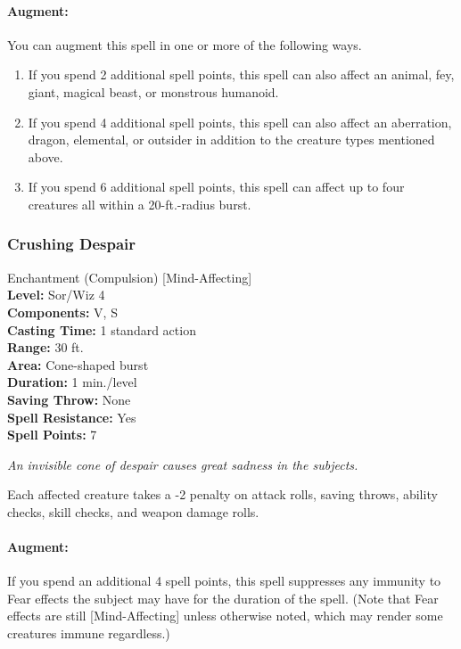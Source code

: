 \paragraph{Augment:} You can augment this spell in one or more of the following ways.
\begin{enumerate}
 \item If you spend 2 additional spell points, this spell can also affect an animal, fey, giant, magical beast, or monstrous humanoid.
 \item If you spend 4 additional spell points, this spell can also affect an aberration, dragon, elemental, or outsider in addition to the creature types mentioned above.
 \item If you spend 6 additional spell points, this spell can affect up to four creatures all within a 20-ft.-radius burst.
\end{enumerate}
\subsubsection{Crushing Despair}
\label{Spell:CrushingDespair}
Enchantment (Compulsion) [Mind-Affecting]
\\ \textbf{Level:} Sor/Wiz 4
\\ \textbf{Components:} V, S
\\ \textbf{Casting Time:} 1 standard action
\\ \textbf{Range:} 30 ft.
\\ \textbf{Area:} Cone-shaped burst
\\ \textbf{Duration:} 1 min./level
\\ \textbf{Saving Throw:} None
\\ \textbf{Spell Resistance:} Yes
\\ \textbf{Spell Points:} 7

\emph{An invisible cone of despair causes great sadness in the subjects.}

Each affected creature takes a -2 penalty on attack rolls, saving throws, ability checks, skill checks, and weapon damage rolls.

\paragraph{Augment:} If you spend an additional 4 spell points, 
this spell suppresses any immunity to Fear effects the subject may have for the duration of the spell.
(Note that Fear effects are still [Mind-Affecting] unless otherwise noted, which may render some creatures immune regardless.)

